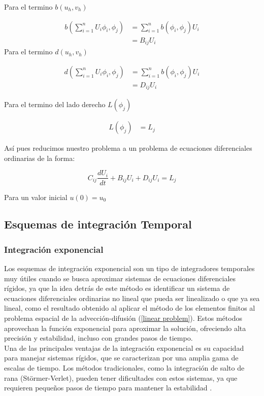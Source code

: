 \documentclass[11pt, spanish]{article}
\begin{document}
Para el termino $b(u_h,v_h)$

\begin{align}
    b(\sum_{i=1}^{n} U_i \phi_i,\phi_j) &= \sum_{i=1}^{n} b(\phi_i,\phi_j) U_i\\
    &= B_{ij} U_i
\end{align}
Para el termino $d(u_h,v_h)$

\begin{align}
    d(\sum_{i=1}^{n} U_i \phi_i,\phi_j) &= \sum_{i=1}^{n} b(\phi_i,\phi_j) U_i\\
    &= D_{ij} U_i
\end{align}

Para el termino del lado derecho $L(\phi_j)$ 

\begin{align}
    L(\phi_j) &=  L_j
\end{align}

As\'i pues reducimos nuestro problema a un problema de ecuaciones diferenciales ordinarias de la forma: 

\begin{equation}
    \label{ods}
    C_{ij} \frac{d U_i}{dt} + B_{ij} U_i + D_{ij} U_i  =L_j
\end{equation}

Para un valor inicial $u(0)=u_0$
\subsection{Esquemas de integraci\'on Temporal }
\subsubsection{Integraci\'on  exponencial}

Los esquemas de integración exponencial son un tipo de integradores temporales muy útiles cuando se busca aproximar sistemas de ecuaciones diferenciales rígidos, ya que la idea detrás de este método es identificar un sistema de ecuaciones diferenciales ordinarias no lineal que pueda ser linealizado o que ya sea lineal, como el resultado obtenido al aplicar el método de los elementos finitos al problema espacial de la advección-difusión (\ref{linear problem}). Estos métodos aprovechan la función exponencial para aproximar la solución, ofreciendo alta precisión y estabilidad, incluso con grandes pasos de tiempo.\\

Una de las principales ventajas de la integración exponencial es su capacidad para manejar sistemas rígidos, que se caracterizan por una amplia gama de escalas de tiempo. Los métodos tradicionales, como la integración de salto de rana (Störmer-Verlet), pueden tener dificultades con estos sistemas, ya que requieren pequeños pasos de tiempo para mantener la estabilidad \cite{Hochbruck2010,Schulze}.\\
\end{document}
